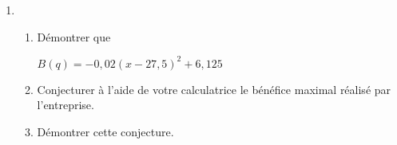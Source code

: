 \documentclass{exercice}
\begin{document}
\begin{multicols*}{2}
\begin{exo}
\begin{enumerate}
          \item \begin{enumerate}
            \item Démontrer que

              \centerline{$B(q) = -0,02(x - 27,5)^2 + 6,125$}
            \item Conjecturer à l'aide de votre calculatrice le bénéfice maximal réalisé par l'entreprise.
            \item Démontrer cette conjecture. 
            \end{enumerate}
        \end{enumerate}
\end{exo}


\end{multicols*} 
\end{document}
